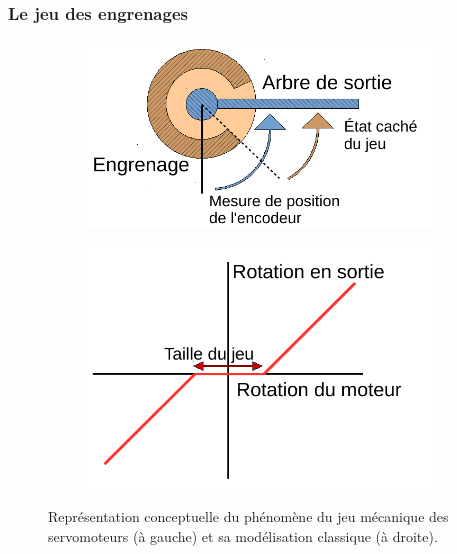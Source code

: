 \subsubsection{Le jeu des engrenages}

\begin{figure}[htb]
    \centerfloat
    \begin{subfigure}{0.4\paperwidth}
        \centering
        \includegraphics[type=pdf,ext=.pdf,read=.pdf,width=1.0\linewidth]{../schema/backlash_meca}
    \end{subfigure}
    \begin{subfigure}{0.4\paperwidth}
        \centering
        \includegraphics[type=pdf,ext=.pdf,read=.pdf,width=1.0\linewidth]{../schema/backlash_function}
    \end{subfigure}
    \caption{\label{fig:robot_backlash} 
        Représentation conceptuelle du phénomène du jeu mécanique des servomoteurs (à gauche) 
        et sa modélisation classique (à droite).
    }
\end{figure}

